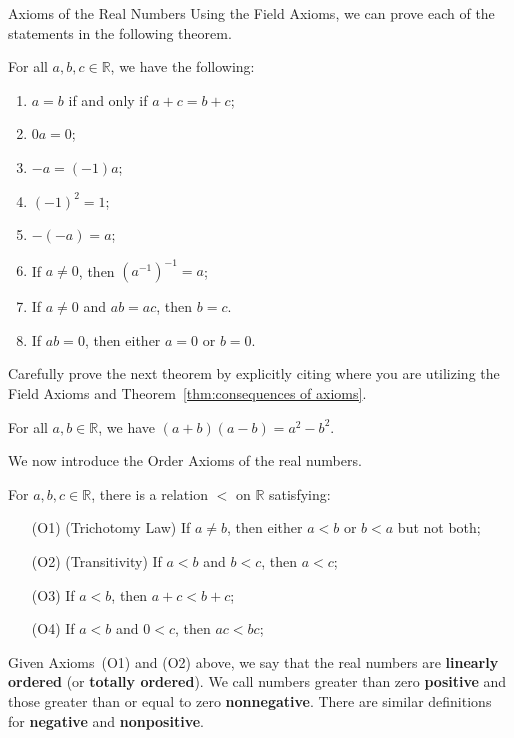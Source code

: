 \begin{section}{Axioms of the Real Numbers}
Using the Field Axioms, we can prove each of the statements in the following theorem.

\begin{theorem}\label{thm:consequences of axioms}
For all $a,b,c\in\mathbb{R}$, we have the following:
\begin{enumerate}[label=\textrm{(\alph*)}]
\item $a=b$ if and only if $a+c=b+c$;
\item $0a=0$;
\item $-a=(-1)a$;
\item $(-1)^2 = 1$;
\item $-(-a)=a$;
\item If $a\neq 0$, then $(a^{-1})^{-1}=a$;
\item If $a\neq 0$ and $ab = ac$, then $b = c$.
\item If $ab=0$, then either $a=0$ or $b=0$.
\end{enumerate}
\end{theorem}

Carefully prove the next theorem by explicitly citing where you are utilizing the Field Axioms and Theorem~\ref{thm:consequences of axioms}.

\begin{theorem}
For all $a,b\in\mathbb{R}$, we have $(a+b)(a-b)=a^2-b^2$.
\end{theorem}

We now introduce the Order Axioms of the real numbers.

\begin{orderaxioms}\label{axiom:order axioms}
For $a,b,c\in \mathbb{R}$, there is a relation $<$ on $\mathbb{R}$ satisfying:
\begin{enumerate}
\item[(O1)] (Trichotomy Law) If $a\neq b$, then either $a<b$ or $b<a$ but not both;
\item[(O2)] (Transitivity) If $a<b$ and $b<c$, then $a<c$;
\item[(O3)] If $a<b$, then $a+c<b+c$;
\item[(O4)] If $a<b$ and $0<c$, then $ac<bc$;  
\end{enumerate}
\end{orderaxioms}

Given Axioms~(O1) and (O2) above, we say that the real numbers are \textbf{linearly ordered} (or \textbf{totally ordered}). We call numbers greater than zero \textbf{positive} and those greater than or equal to zero \textbf{nonnegative}. There are similar definitions for \textbf{negative} and \textbf{nonpositive}. 


\end{section}
